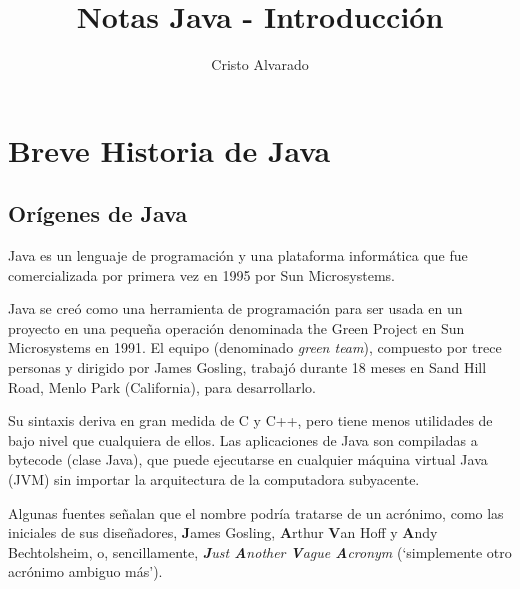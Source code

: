 \documentclass[12pt]{article}
\newcounter{it}
\theoremstyle{largebreak}
\begin{document}
    \setlength{\parskip}{5pt} %
    \setlength{\parindent}{12pt} %
    \title{Notas Java - Introducción}
    \author{Cristo Alvarado}
    \maketitle
    
    \tableofcontents

    \lstlistoflistings

    \section{Breve Historia de Java}

    \subsection{Orígenes de Java}

    \begin{mydef}
        Java es un lenguaje de programación y una plataforma informática que fue comercializada por primera vez en 1995 por Sun Microsystems.
    \end{mydef}

    Java se creó como una herramienta de programación para ser usada en un proyecto en una pequeña operación denominada the Green Project en Sun Microsystems en 1991. El equipo (denominado \textit{green team}), compuesto por trece personas y dirigido por James Gosling, trabajó durante 18 meses en Sand Hill Road, Menlo Park (California), para desarrollarlo.

    Su sintaxis deriva en gran medida de C y C++, pero tiene menos utilidades de bajo nivel que cualquiera de ellos. Las aplicaciones de Java son compiladas a bytecode (clase Java), que puede ejecutarse en cualquier máquina virtual Java (JVM) sin importar la arquitectura de la computadora subyacente.

    \begin{obs}
        Algunas fuentes señalan que el nombre podría tratarse de un acrónimo, como las iniciales de sus diseñadores, \textbf{J}ames Gosling, \textbf{A}rthur \textbf{V}an Hoff y \textbf{A}ndy Bechtolsheim, o, sencillamente, \textit{\textbf{J}ust \textbf{A}nother \textbf{V}ague \textbf{A}cronym} (‘simplemente otro acrónimo ambiguo más’).
    \end{obs}
\end{document}
